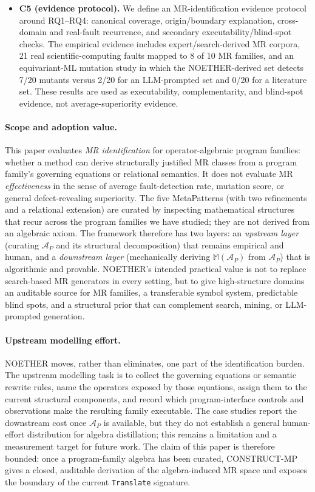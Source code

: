 \documentclass[manuscript]{acmart}
\begin{document}
\begin{itemize}
  \item \textbf{C5 (evidence protocol).} We define an MR-identification evidence protocol around RQ1--RQ4: canonical coverage, origin/boundary explanation, cross-domain and real-fault recurrence, and secondary executability/blind-spot checks. The empirical evidence includes expert/search-derived MR corpora, 21 real scientific-computing faults mapped to 8 of 10 MR families, and an equivariant-ML mutation study in which the NOETHER-derived set detects 7/20 mutants versus 2/20 for an LLM-prompted set and 0/20 for a literature set. These results are used as executability, complementarity, and blind-spot evidence, not average-superiority evidence.
\end{itemize}

\paragraph{Scope and adoption value.} This paper evaluates \emph{MR identification} for operator-algebraic program families: whether a method can derive structurally justified MR classes from a program family's governing equations or relational semantics. It does not evaluate MR \emph{effectiveness} in the sense of average fault-detection rate, mutation score, or general defect-revealing superiority. The five MetaPatterns (with two refinements and a relational extension) are curated by inspecting mathematical structures that recur across the program families we have studied; they are not derived from an algebraic axiom. The framework therefore has two layers: an \emph{upstream layer} (curating $\mathcal{A}_P$ and its structural decomposition) that remains empirical and human, and a \emph{downstream layer} (mechanically deriving $\mathbb{M}(\mathcal{A}_P)$ from $\mathcal{A}_P$) that is algorithmic and provable. NOETHER's intended practical value is not to replace search-based MR generators in every setting, but to give high-structure domains an auditable source for MR families, a transferable symbol system, predictable blind spots, and a structural prior that can complement search, mining, or LLM-prompted generation.

\paragraph{Upstream modelling effort.} NOETHER moves, rather than eliminates, one part of the identification burden. The upstream modelling task is to collect the governing equations or semantic rewrite rules, name the operators exposed by those equations, assign them to the current structural components, and record which program-interface controls and observations make the resulting family executable. The case studies report the downstream cost once $\mathcal{A}_P$ is available, but they do not establish a general human-effort distribution for algebra distillation; this remains a limitation and a measurement target for future work. The claim of this paper is therefore bounded: once a program-family algebra has been curated, CONSTRUCT-MP gives a closed, auditable derivation of the algebra-induced MR space and exposes the boundary of the current \texttt{Translate} signature.
\end{document}
